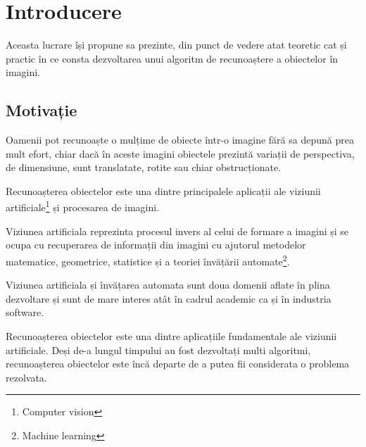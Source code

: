 \chapter{Introducere}

Aceasta lucrare își propune sa prezinte, din punct de vedere atat teoretic cat și practic în ce consta dezvoltarea unui algoritm de recunoaștere a obiectelor în imagini.



\section{Motivație}

Oamenii pot recunoaște o mulțime de obiecte într-o imagine fără sa depună prea mult efort, chiar dacă în aceste imagini obiectele prezintă variații de perspectiva, de dimensiune, sunt translatate, rotite sau chiar obstrucționate.

Recunoașterea obiectelor este una dintre principalele aplicații ale viziunii artificiale\footnote{Computer vision} și procesarea de imagini. 

Viziunea artificiala reprezinta procesul invers al celui de formare a imagini și se ocupa cu recuperarea de informații din imagini cu ajutorul metodelor matematice, geometrice, statistice și a teoriei învățării automate\footnote{Machine learning}.






Viziunea artificiala și învățarea automata sunt doua domenii aflate în plina dezvoltare și sunt de mare interes atât în cadrul academic ca și în industria software.

Recunoașterea obiectelor este una dintre aplicațiile fundamentale ale viziunii artificiale. Deși de-a lungul timpului au fost dezvoltați multi algoritmi, recunoașterea obiectelor este încă departe de a putea fii considerata o problema rezolvata.

